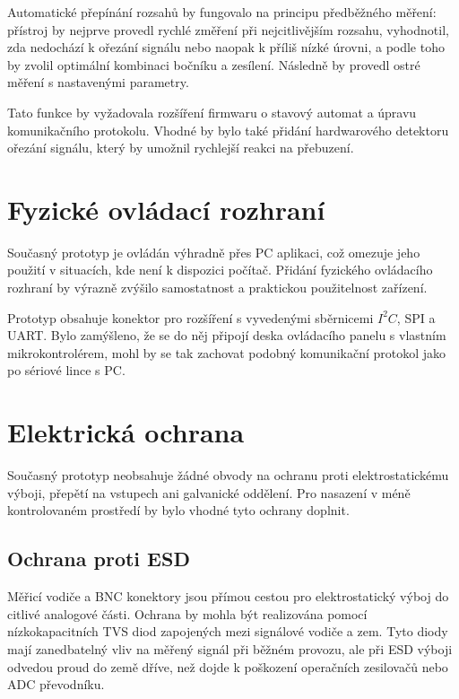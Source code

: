 Automatické přepínání rozsahů by fungovalo na principu předběžného měření: přístroj by nejprve provedl rychlé změření při nejcitlivějším rozsahu, vyhodnotil, zda nedochází k ořezání signálu nebo naopak k příliš nízké úrovni, a podle toho by zvolil optimální kombinaci bočníku a zesílení. Následně by provedl ostré měření s nastavenými parametry.

Tato funkce by vyžadovala rozšíření firmwaru o stavový automat a úpravu komunikačního protokolu. Vhodné by bylo také přidání hardwarového detektoru ořezání signálu, který by umožnil rychlejší reakci na přebuzení.

\section{Fyzické ovládací rozhraní}

Současný prototyp je ovládán výhradně přes PC aplikaci, což omezuje jeho použití v situacích, 
kde není k dispozici počítač. 
Přidání fyzického ovládacího rozhraní by výrazně zvýšilo samostatnost 
a praktickou použitelnost zařízení.

Prototyp obsahuje konektor pro rozšíření s vyvedenými sběrnicemi $I^{2}C$, SPI a UART.
Bylo zamýšleno, že se do něj připojí deska ovládacího panelu s vlastním mikrokontrolérem, 
mohl by se tak zachovat podobný komunikační protokol jako po sériové lince s PC.

\section{Elektrická ochrana}

Současný prototyp neobsahuje žádné obvody na ochranu proti elektrostatickému výboji, přepětí na vstupech ani galvanické oddělení. Pro nasazení v méně kontrolovaném prostředí by bylo vhodné tyto ochrany doplnit.

\subsection{Ochrana proti ESD}

Měřicí vodiče a BNC konektory jsou přímou cestou pro elektrostatický výboj do citlivé 
analogové části. Ochrana by mohla být realizována pomocí nízkokapacitních TVS diod 
 zapojených mezi signálové vodiče a zem. 
Tyto diody mají zanedbatelný vliv na měřený signál při běžném provozu, 
ale při ESD výboji odvedou proud do země dříve, 
než dojde k poškození operačních zesilovačů nebo ADC převodníku.

